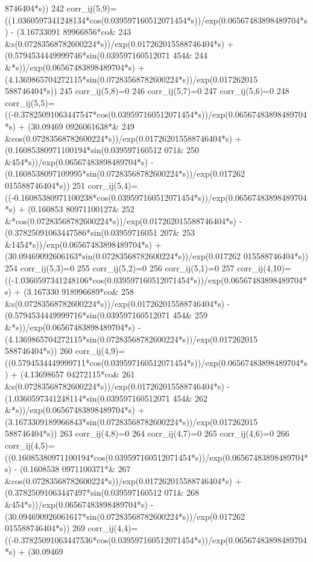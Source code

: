 \begin{DoxyCode}
      8746404*s)) 
242     corr\_ij(5,9)=((1.0360597341248134*cos(0.039597160512071454*s))/exp(0.06567483898489704*s) - (3.16733091
      89966856*co&
243          &s(0.07283568782600224*s))/exp(0.017262015588746404*s) + (0.5794534449999746*sin(0.039597160512071
      454&
244          &*s))/exp(0.06567483898489704*s) + (4.1369865704272115*sin(0.07283568782600224*s))/exp(0.017262015
      588746404*s)) 
245     corr\_ij(5,8)=0
246     corr\_ij(5,7)=0
247     corr\_ij(5,6)=0
248     corr\_ij(5,5)=((-0.37825091063447547*cos(0.039597160512071454*s))/exp(0.06567483898489704*s) + (30.09469
      0926061638*&
249          &cos(0.07283568782600224*s))/exp(0.017262015588746404*s) + (0.16085380971100194*sin(0.039597160512
      071&
250          &454*s))/exp(0.06567483898489704*s) - (0.1608538097109995*sin(0.07283568782600224*s))/exp(0.017262
      015588746404*s)) 
251     corr\_ij(5,4)=((-0.16085380971100238*cos(0.039597160512071454*s))/exp(0.06567483898489704*s) + (0.160853
      80971100127&
252          &*cos(0.07283568782600224*s))/exp(0.017262015588746404*s) - (0.37825091063447586*sin(0.03959716051
      207&
253          &1454*s))/exp(0.06567483898489704*s) + (30.09469092606163*sin(0.07283568782600224*s))/exp(0.017262
      015588746404*s)) 
254     corr\_ij(5,3)=0
255     corr\_ij(5,2)=0
256     corr\_ij(5,1)=0
257     corr\_ij(4,10)=((-1.0360597341248106*cos(0.039597160512071454*s))/exp(0.06567483898489704*s) + (3.167330
      918996689*co&
258          &s(0.07283568782600224*s))/exp(0.017262015588746404*s) - (0.5794534449999716*sin(0.039597160512071
      454&
259          &*s))/exp(0.06567483898489704*s) - (4.1369865704272115*sin(0.07283568782600224*s))/exp(0.017262015
      588746404*s)) 
260     corr\_ij(4,9)=((0.5794534449999711*cos(0.039597160512071454*s))/exp(0.06567483898489704*s) + (4.13698657
      04272115*co&
261          &s(0.07283568782600224*s))/exp(0.017262015588746404*s) - (1.0360597341248114*sin(0.039597160512071
      454&
262          &*s))/exp(0.06567483898489704*s) + (3.1673309189966843*sin(0.07283568782600224*s))/exp(0.017262015
      588746404*s)) 
263     corr\_ij(4,8)=0
264     corr\_ij(4,7)=0
265     corr\_ij(4,6)=0
266     corr\_ij(4,5)=((0.16085380971100194*cos(0.039597160512071454*s))/exp(0.06567483898489704*s) - (0.1608538
      0971100371*&
267          &cos(0.07283568782600224*s))/exp(0.017262015588746404*s) + (0.37825091063447497*sin(0.039597160512
      071&
268          &454*s))/exp(0.06567483898489704*s) - (30.094690926061617*sin(0.07283568782600224*s))/exp(0.017262
      015588746404*s)) 
269     corr\_ij(4,4)=((-0.37825091063447536*cos(0.039597160512071454*s))/exp(0.06567483898489704*s) + (30.09469

\end{DoxyCode}
